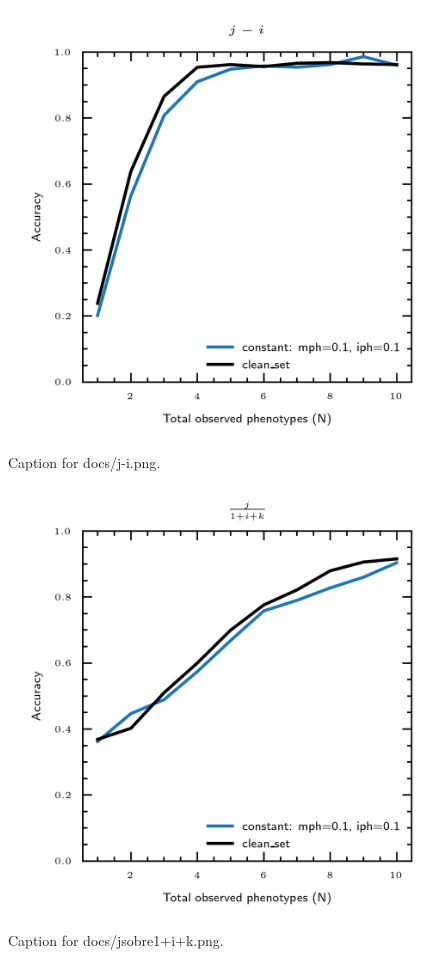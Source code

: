 \documentclass{article}
\begin{document}
\begin{figure}[h] \centering \includegraphics{docs/j-i.png} \caption{Caption for docs/j-i.png.} \end{figure}
\begin{figure}[h] \centering \includegraphics{docs/jsobre1+i+k.png} \caption{Caption for docs/jsobre1+i+k.png.} \end{figure}
\end{document}
